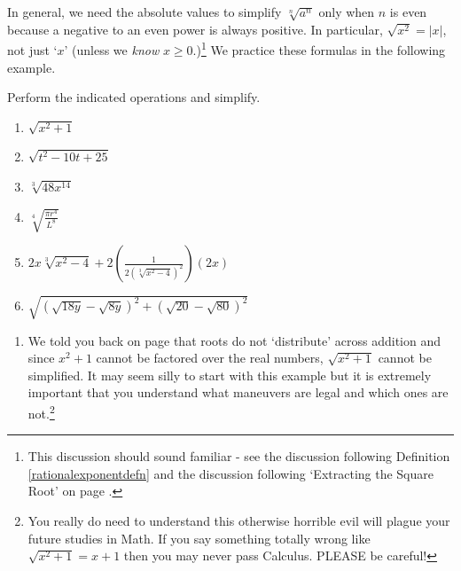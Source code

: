 \documentclass{ximera}
\begin{document}
 

In general, we need the absolute values to simplify $\sqrt[n]{a^{n}}$ only when $n$ is even because a negative to an even power is always positive.  In particular, $\sqrt{x^2} = |x|$, not just `$x$' (unless we \textit{know} $x \geq 0$.)\footnote{This discussion should sound familiar - see the discussion following Definition \ref{rationalexponentdefn} and the discussion following `Extracting the Square Root' on page \pageref{extractingthesquareroot}.}  We practice these formulas in the following example.

\begin{example}\label{simplifyradexpressions}  Perform the indicated operations and simplify.


\begin{enumerate}

\item  $\sqrt{x^{2} + 1}$

\item  $\sqrt{t^2-10t+25}$

\item  $\sqrt[3]{48x^{14}}$

\item  $\sqrt[4]{\frac{\pi r^{4}}{L^{8}}}$

\item $2x \sqrt[3]{x^2-4} + 2\left(\frac{1}{2(\sqrt[3]{x^2-4})^2}\right)  (2x)$ 

\item  $\sqrt{(\sqrt{18y} - \sqrt{8y})^2 + (\sqrt{20} - \sqrt{80})^2}$ 

\end{enumerate}

\begin{explanation}

\begin{enumerate}

\item We told you back on page \pageref{donotdistributeexponents} that roots do not `distribute' across addition and since $x^{2} + 1$ cannot be factored over the real numbers, $\sqrt{x^{2} + 1}$ cannot be simplified.  It may seem silly to start with this example but it is extremely important that you understand what maneuvers are legal and which ones are not.\footnote{You really do need to understand this otherwise horrible evil will plague your future studies in Math.  If you say something totally wrong like $\sqrt{x^{2} + 1} = x + 1$ then you may never pass Calculus.  PLEASE be careful!}


\end{enumerate}
\end{explanation}
\end{example}
\end{document}
